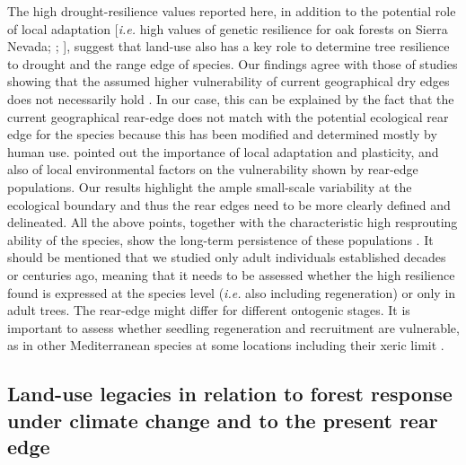 The high drought-resilience values reported here, in addition to the potential role of local adaptation {[}\emph{i.e.} high values of genetic resilience for oak forests on Sierra Nevada; \textcite{ValbuenaCarabanaGil2013GeneticResilience}; \textcite{ValbuenaCarabanaGil2017CentenaryCoppicing}{]}, suggest that land-use also has a key role to determine tree resilience to drought and the range edge of species. Our findings agree with those of studies showing that the assumed higher vulnerability of current geographical dry edges does not necessarily hold \autocite[\emph{e.g.}][]{CavinJump2017HighestDrought}. In our case, this can be explained by the fact that the current geographical rear-edge does not match with the potential ecological rear edge for the species because this has been modified and determined mostly by human use. \textcite{MartinezVilalta2018RearWindow} pointed out the importance of local adaptation and plasticity, and also of local environmental factors on the vulnerability shown by rear-edge populations. Our results highlight the ample small-scale variability at the ecological boundary and thus the rear edges need to be more clearly defined and delineated. All the above points, together with the characteristic high resprouting ability of the species, show the long-term persistence of these populations \autocite{BellinghamSparrow2000ResproutingLife}. It should be mentioned that we studied only adult individuals established decades or centuries ago, meaning that it needs to be assessed whether the high resilience found is expressed at the species level (\emph{i.e.} also including regeneration) or only in adult trees. The rear-edge might differ for different ontogenic stages. It is important to assess whether seedling regeneration and recruitment are vulnerable, as in other Mediterranean species at some locations including their xeric limit \autocite{Castroetal2004SeedlingEstablishment,VilaCabreraetal2011StructuralClimatic,GeaIzquierdoetal2015ThisEnd}.

\subsection{Land-use legacies in relation to forest response under climate change and to the present rear edge}\label{sec:dendroLand}

